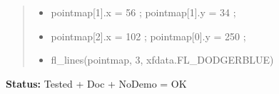 \begin{boxedminipage}{\funcwidth}
\begin{quote}
\begin{itemize}
  \item pointmap[1].x = 56 ; pointmap[1].y = 34 ;



  \item pointmap[2].x = 102 ; pointmap[0].y = 250 ;



  \item fl\_lines(pointmap, 3, xfdata.FL\_DODGERBLUE)



\end{itemize}

\end{quote}

\textbf{Status:} Tested + Doc + NoDemo = OK



    \end{boxedminipage}

    \label{xformslib:flxbasic:fl_line}

    \vspace{0.5ex}

